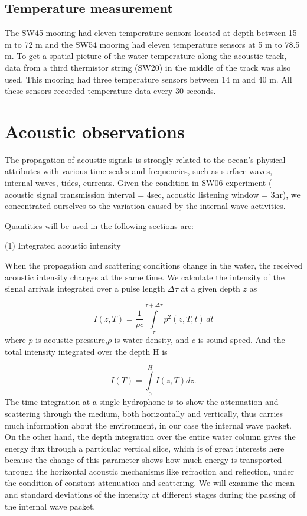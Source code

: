 \subsection{Temperature measurement}
The SW45 mooring had eleven temperature sensors located at depth
between 15 m to 72 m and the SW54 mooring had eleven temperature
sensors at 5 m to 78.5 m. To get a spatial picture of the water
temperature along the acoustic track, data from a third thermistor
string (SW20) in the middle of the track was also used. This mooring
had three temperature sensors between 14 m and 40 m. All these
sensors recorded temperature data every 30 seconds.

\section{Acoustic observations}

The propagation of acoustic signals is strongly related to the ocean's physical attributes with various time scales and frequencies, such as surface waves, internal waves, tides, currents. Given the condition in SW06 experiment  ( acoustic signal transmission interval = 4sec, acoustic listening window = 3hr), we concentrated ourselves to the variation caused by the internal wave activities. 

Quantities will be used in the following sections are:

(1) Integrated acoustic intensity  

When the propagation and scattering conditions change in the water, the received acoustic intensity changes at the same time. We calculate the intensity of the signal arrivals integrated over a pulse
length $\Delta\tau$ at a given depth $z$ as

\begin{equation}\label{eq:intensity1}
I(z,T)=\displaystyle\frac{1}{{\rho}c}\int\limits^{\tau+\Delta\tau}_{\tau}p^2(z,T,t)\,dt
\end{equation}
where $p$ is acoustic
pressure,$\rho$ is water density, and $c$ is sound speed.
And the total intensity integrated over the depth H is

\begin{equation}\label{eq:intensity2}
I(T)=\displaystyle\int\limits^H_0I(z,T)dz.
\end{equation}
The time integration at a single hydrophone is to show the attenuation and scattering through the medium, both horizontally and vertically, thus carries much information about the environment, in our case the internal wave packet. On the other hand, the depth integration over the entire water column gives the energy flux through a particular vertical slice, which is of great interests here because the change of this parameter shows how much energy is transported through the horizontal acoustic mechanisms like refraction and reflection, under the condition of constant attenuation and scattering. 
We will examine the mean and standard deviations of the intensity at different stages during the passing of the internal wave packet. 

